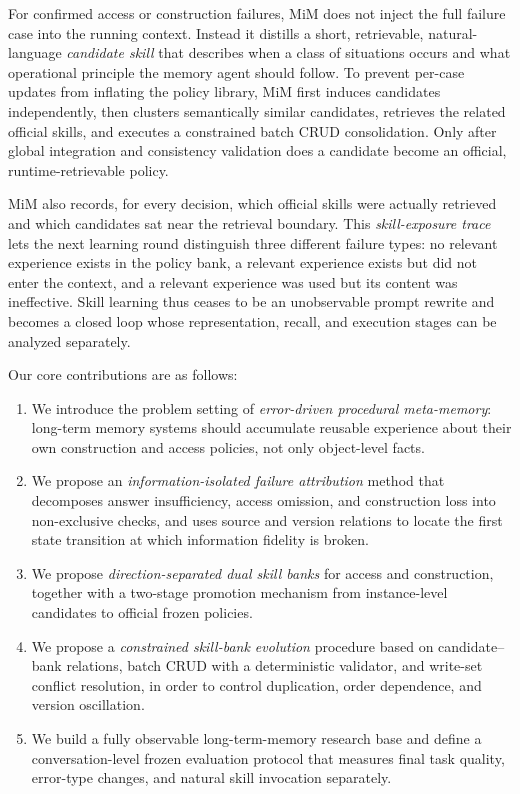 \documentclass[11pt]{article}
\begin{document}
For confirmed access or construction failures, MiM does not inject the full
failure case into the running context. Instead it distills a short, retrievable,
natural-language \emph{candidate skill} that describes when a class of situations
occurs and what operational principle the memory agent should follow. To prevent
per-case updates from inflating the policy library, MiM first induces candidates
independently, then clusters semantically similar candidates, retrieves the
related official skills, and executes a constrained batch CRUD consolidation.
Only after global integration and consistency validation does a candidate become
an official, runtime-retrievable policy.

MiM also records, for every decision, which official skills were actually
retrieved and which candidates sat near the retrieval boundary. This
\emph{skill-exposure trace} lets the next learning round distinguish three
different failure types: no relevant experience exists in the policy bank, a
relevant experience exists but did not enter the context, and a relevant
experience was used but its content was ineffective. Skill learning thus ceases
to be an unobservable prompt rewrite and becomes a closed loop whose
representation, recall, and execution stages can be analyzed separately.

Our core contributions are as follows:

\begin{enumerate}[leftmargin=*,itemsep=2pt,topsep=4pt]
  \item We introduce the problem setting of \emph{error-driven procedural
  meta-memory}: long-term memory systems should accumulate reusable experience
  about their own construction and access policies, not only object-level facts.
  \item We propose an \emph{information-isolated failure attribution} method that
  decomposes answer insufficiency, access omission, and construction loss into
  non-exclusive checks, and uses source and version relations to locate the
  first state transition at which information fidelity is broken.
  \item We propose \emph{direction-separated dual skill banks} for access and
  construction, together with a two-stage promotion mechanism from
  instance-level candidates to official frozen policies.
  \item We propose a \emph{constrained skill-bank evolution} procedure based on
  candidate--bank relations, batch CRUD with a deterministic validator, and
  write-set conflict resolution, in order to control duplication, order
  dependence, and version oscillation.
  \item We build a fully observable long-term-memory research base and define a
  conversation-level frozen evaluation protocol that measures final task quality,
  error-type changes, and natural skill invocation separately.
\end{enumerate}
\end{document}
